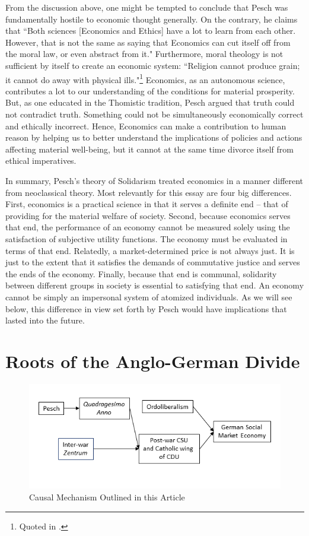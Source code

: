 \documentclass{article}
\begin{document}
From the discussion above, one might be tempted to conclude that Pesch was fundamentally hostile to economic thought generally.  On the contrary, he claims that ``Both sciences [Economics and Ethics] have a lot to learn from each other.  However, that is not the same as saying that Economics can cut itself off from the moral law, or even abstract from it." \citep[chap. 10]{pesch2004}  Furthermore, moral theology is not sufficient by itself to create an economic system:  ``Religion cannot produce grain; it cannot do away with physical ills."\footnote{Quoted in \citet[p. 151]{mueller1951}.}  Economics, as an autonomous science, contributes a lot to our understanding of the conditions for material prosperity.  But, as one educated in the Thomistic tradition, Pesch argued that truth could not contradict truth.  Something could not be simultaneously economically correct and ethically incorrect.  Hence, Economics can make a contribution to human reason by helping us to better understand the implications of policies and actions affecting material well-being, but it cannot at the same time divorce itself from ethical imperatives.\medskip

In summary, Pesch’s theory of Solidarism treated economics in a manner different from neoclassical theory.  Most relevantly for this essay are four big differences.  First, economics is a practical science in that it serves a definite end – that of providing for the material welfare of society.  Second, because economics serves that end, the performance of an economy cannot be measured solely using the satisfaction of subjective utility functions.  The economy must be evaluated in terms of that end.  Relatedly, a market-determined price is not always just.  It is just to the extent that it satisfies the demands of commutative justice and serves the ends of the economy.  Finally, because that end is communal, solidarity between different groups in society is essential to satisfying that end.  An economy cannot be simply an impersonal system of atomized individuals.  As we will see below, this difference in view set forth by Pesch would have implications that lasted into the future.

\section{Roots of the Anglo-German Divide}

\begin{figure}
    \centering
    \includegraphics{Figure1.png}
    \caption{Causal Mechanism Outlined in this Article}
    \label{fig:causalmechanism}
\end{figure}
\end{document}
